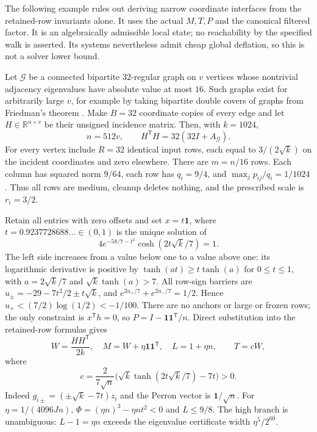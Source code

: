 \documentclass[11pt]{amsart}
\theoremstyle{definition}\newtheorem{definition}[theorem]{Definition}
\theoremstyle{remark}\newtheorem{remark}[theorem]{Remark}
\numberwithin{equation}{section}
\begin{document}
The following example rules out deriving narrow coordinate interfaces
from the retained-row invariants alone.  It uses the actual $M,T,P$ and
the canonical filtered factor.  It is an algebraically admissible local
state; no reachability by the specified walk is asserted.  Its systems
nevertheless admit cheap global deflation, so this is not a solver lower
bound.

Let $\mathcal G$ be a connected bipartite $32$-regular graph on $v$
vertices whose nontrivial adjacency eigenvalues have absolute value at
most $16$.  Such graphs exist for arbitrarily large $v$, for example by
taking bipartite double covers of graphs from Friedman's theorem
\cite[Theorem 1]{bordenave}.  Make $B=32$ coordinate copies
of every edge and let $H\in\mathbb R^{n\times v}$ be their unsigned
incidence matrix.  Then, with $k=1024$,
\[
 n=512v,\qquad H^{\mathsf T}H=32(32I+A_{\mathcal G}).
\]
For every vertex include $R=32$ identical input rows, each equal to
$3/(2\sqrt k)$ on the incident coordinates and zero elsewhere.  There
are $m=n/16$ rows.  Each column has squared norm $9/64$, each row has
$q_i=9/4$, and $\max_jp_{ij}/q_i=1/1024$.  Thus all rows are medium,
cleanup deletes nothing, and the prescribed scale is $r_i=3/2$.

Retain all entries with zero offsets and set $x=t\mathbf1$, where
$t=0.9237728688\ldots\in(0,1)$ is the unique solution of
\[
 4e^{-58/7-t^2}\cosh(2t\sqrt k/7)=1.
\]
The left side increases from a value below one to a value above one: its logarithmic derivative is positive by $\tanh(at)\ge t\tanh(a)$ for $0\le t\le1$, with $a=2\sqrt{k}/7$ and $\sqrt{k}\tanh(a)>7$.
All row-sign barriers are
$u_\pm=-29-7t^2/2\pm t\sqrt k$, and
$e^{2u_+/7}+e^{2u_-/7}=1/2$.  Hence $u_+<(7/2)\log(1/2)<-1/100$.
There are no anchors or large or frozen rows; the only constraint is
$x^{\mathsf T}h=0$, so $P=I-\mathbf1\mathbf1^{\mathsf T}/n$.
Direct substitution into the retained-row formulas gives
\begin{equation}
 W=\frac{HH^{\mathsf T}}{2k},\quad
 M=W+\eta\mathbf1\mathbf1^{\mathsf T},\quad L=1+\eta n,
 \qquad T=cW,                                      \label{ifc:interface:actual}
\end{equation}
where
\[
 c=\frac{2}{7\sqrt n}
    \bigl(\sqrt k\tanh(2t\sqrt k/7)-7t\bigr)>0.
\]
Indeed $g_{i\pm}=(\pm\sqrt k-7t)z_i$ and the Perron vector is
$\mathbf1/\sqrt n$.  For $\eta=1/(4096Jn)$,
$\Phi=(\eta n)^3-\eta nt^2<0$ and $L\le9/8$.
The high branch is unambiguous: $L-1=\eta n$ exceeds the eigenvalue
certificate width $\eta^5/2^{60}$.
\end{document}
